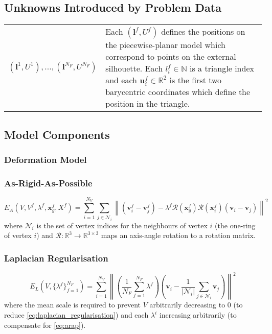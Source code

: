\documentclass[a4paper,10pt]{article}
\newcommand{\mb}{\mathbf}
\begin{document}
\subsection{Unknowns Introduced by Problem Data}
\begin{tabularx}{\textwidth}{ l | X}
$(\mb{l}^1, U^1), ..., (\mb{l}^{N_F}, U^{N_F})$ & Each $(\mb{l}^f, U^f)$ defines the positions on the piecewise-planar model which correspond to points on the external silhouette. 
Each $l^f_i \in \mathbb{N}$ is a triangle index and each $\mb{u}_i^f \in \mathbb{R}^2$ is the first two barycentric coordinates which define the position in the triangle.
\end{tabularx}

\subsection{Model Components}
\subsubsection{Deformation Model}
\subsubsection*{As-Rigid-As-Possible}

\begin{equation}
\label{eq:arap}
E_{A}(V, V^f, \lambda^f, \mb{x}^f_g, X^f) = \sum_{i=1}^{N_V} \sum_{j \in \mathcal{N}_i} \left\| \left( \mb{v}^f_i - \mb{v}^f_j \right) - \lambda^f \mathcal{R}(\mb{x}^f_g) \mathcal{R}(\mb{x}^f_i) \left( \mb{v}_i - \mb{v}_j \right) \right\|^2
\end{equation}
where $\mathcal{N}_i$ is the set of vertex indices for the neighbours of vertex $i$ (the one-ring of vertex $i$) and $\mathcal{R} \colon \mathbb{R}^3 \to \mathbb{R}^{3 \times 3}$ maps an axis-angle rotation to a rotation matrix.

\subsubsection*{Laplacian Regularisation}

\begin{equation}
\label{eq:laplacian_regularisation}
E_{L}(V, \{\lambda^f\}_{f=1}^{N_F}) = \sum_{i=1}^{N_V} \left\| \left( \frac{1}{N_F} \sum_{f=1}^{N_F} \lambda^f \right) \left( \mb{v}_i - \frac{1}{ | \mathcal{N}_i |} \sum_{j \in \mathcal{N}_i}  \mb{ v}_j \right) \right\|^2
\end{equation}
where the mean scale is required to prevent $V$ arbitrarily decreasing to 0 (to reduce \eqref{eq:laplacian_regularisation}) and each $\lambda^i$ increasing arbitrarily (to compensate for \eqref{eq:arap}).
\end{document}
